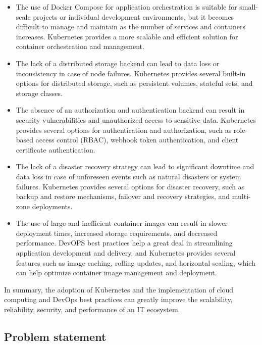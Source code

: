 \begin{itemize}[label={--}]

\item The use of Docker Compose for application orchestration is suitable for small-scale projects or individual development environments, but it becomes difficult to manage and maintain as the number of services and containers increases. Kubernetes provides a more scalable and efficient solution for container orchestration and management. 

\item The lack of a distributed storage backend can lead to data loss or inconsistency in case of node failures. Kubernetes provides several built-in options for distributed storage, such as persistent volumes, stateful sets, and storage classes. 

\item The absence of an authorization and authentication backend can result in security vulnerabilities and unauthorized access to sensitive data. Kubernetes provides several options for authentication and authorization, such as role-based access control (RBAC), webhook token authentication, and client certificate authentication. 

\item The lack of a disaster recovery strategy can lead to significant downtime and data loss in case of unforeseen events such as natural disasters or system failures. Kubernetes provides several options for disaster recovery, such as backup and restore mechanisms, failover and recovery strategies, and multi-zone deployments. 

\item The use of large and inefficient container images can result in slower deployment times, increased storage requirements, and decreased performance. DevOPS best practices help a great deal in streamlining application development and delivery, and Kubernetes provides several features such as image caching, rolling updates, and horizontal scaling, which can help optimize container image management and deployment. 

\end{itemize}

In summary, the adoption of Kubernetes and the implementation of cloud computing and DevOps best practices can greatly improve the scalability, reliability, security, and performance of an IT ecosystem. 

\subsection{Problem statement }

